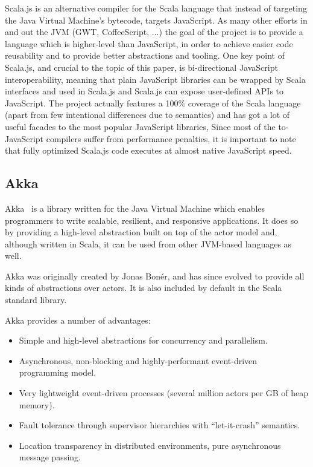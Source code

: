 \documentclass{sig-alternate}
\begin{document}
Scala.js is an alternative compiler for the Scala language that instead of targeting the Java Virtual Machine's bytecode, targets JavaScript.
As many other efforts in and out the JVM (GWT, CoffeeScript, ...) the goal of the project is to provide a language which is higher-level than JavaScript, in order to achieve easier code reusability and to provide better abstractions and tooling.
One key point of Scala.js, and crucial to the topic of this paper, is bi-directional JavaScript interoperability, meaning that plain JavaScript libraries can be wrapped by Scala interfaces and used in Scala.js and Scala.js can expose user-defined APIs to JavaScript.
The project actually features a 100\% coverage of the Scala language  (apart from few intentional differences due to semantics) and has got a lot of useful facades to the most popular JavaScript libraries,
Since most of the to-JavaScript compilers suffer from performance penalties, it is important to note that fully optimized Scala.js code executes at almost native JavaScript speed.


\subsection{Akka}\label{sec:akka}

Akka~\cite{Akka} is a library written for the Java Virtual Machine which enables programmers to write scalable, resilient, and responsive applications. It does so by providing a high-level abstraction built on top of the actor model and, although written in Scala, it can be used from other JVM-based languages as well.

Akka was originally created by Jonas Bon\'{e}r, and has since evolved to provide all kinds of abstractions over actors. It is also included by default in the Scala standard library.

Akka provides a number of advantages:
\begin{itemize}
  \item Simple and high-level abstractions for concurrency and parallelism.
  \item Asynchronous, non-blocking and highly-performant event-driven programming model.
  \item Very lightweight event-driven processes (several million actors per GB of heap memory).
  \item Fault tolerance through supervisor hierarchies with ``let-it-crash'' semantics.
  \item Location transparency in distributed environments, pure asynchronous message passing.
\end{itemize}
\end{document}
